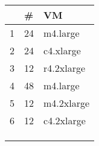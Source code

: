 {\scriptsize
\begin{tabular}{@{}lll@{}}
\toprule
     & \#     & VM         \\ \midrule
1    & 24     & m4.large  \\
2    & 24     & c4.xlarge   \\
3    & 12     & r4.2xlarge   \\
4    & 48     & m4.large \\
5    & 12     & m4.2xlarge   \\
6    & 12     & c4.2xlarge   \\
     &        &            \\
     &        &            \\
     &        &            \\ \bottomrule
\end{tabular}
}
